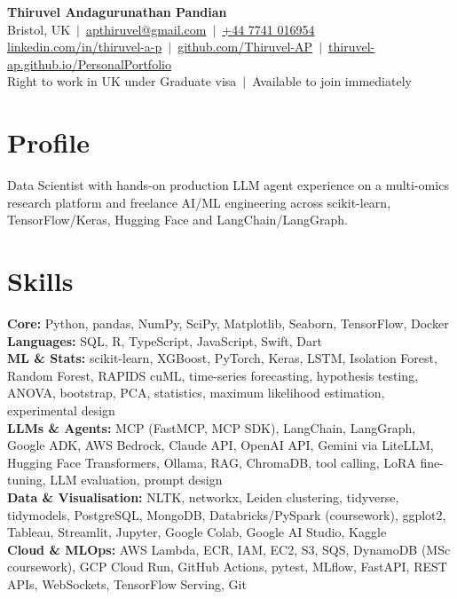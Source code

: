 \documentclass[a4paper,11pt]{article}
\begin{document}
\fontsize{11}{13.2}\selectfont

\begin{center}
  {\LARGE\bfseries Thiruvel Andagurunathan Pandian}\\[3pt]
  Bristol, UK \,$|$\, \href{mailto:apthiruvel@gmail.com}{apthiruvel@gmail.com} \,$|$\, \href{tel:+447741016954}{+44 7741 016954}\\[1pt]
\href{https://www.linkedin.com/in/thiruvel-a-p/}{linkedin.com/in/thiruvel-a-p} \,$|$\, \href{https://github.com/Thiruvel-AP}{github.com/Thiruvel-AP} \,$|$\, \href{https://thiruvel-ap.github.io/PersonalPortfolio/}{thiruvel-ap.github.io/PersonalPortfolio}\\[1pt]
  Right to work in UK under Graduate visa \,$|$\, Available to join immediately
\end{center}

\section{Profile}
Data Scientist with hands-on production LLM agent experience on a multi-omics research platform and freelance AI/ML engineering across scikit-learn, TensorFlow/Keras, Hugging Face and LangChain/LangGraph.

\section{Skills}
\textbf{Core:} Python, pandas, NumPy, SciPy, Matplotlib, Seaborn, TensorFlow, Docker\\[2pt]
\textbf{Languages:} SQL, R, TypeScript, JavaScript, Swift, Dart\\[2pt]
\textbf{ML \& Stats:} scikit-learn, XGBoost, PyTorch, Keras, LSTM, Isolation Forest, Random Forest, RAPIDS cuML, time-series forecasting, hypothesis testing, ANOVA, bootstrap, PCA, statistics, maximum likelihood estimation, experimental design\\[2pt]
\textbf{LLMs \& Agents:} MCP (FastMCP, MCP SDK), LangChain, LangGraph, Google ADK, AWS Bedrock, Claude API, OpenAI API, Gemini via LiteLLM, Hugging Face Transformers, Ollama, RAG, ChromaDB, tool calling, LoRA fine-tuning, LLM evaluation, prompt design\\[2pt]
\textbf{Data \& Visualisation:} NLTK, networkx, Leiden clustering, tidyverse, tidymodels, PostgreSQL, MongoDB, Databricks/PySpark (coursework), ggplot2, Tableau, Streamlit, Jupyter, Google Colab, Google AI Studio, Kaggle\\[2pt]
\textbf{Cloud \& MLOps:} AWS Lambda, ECR, IAM, EC2, S3, SQS, DynamoDB (MSc coursework), GCP Cloud Run, GitHub Actions, pytest, MLflow, FastAPI, REST APIs, WebSockets, TensorFlow Serving, Git
\end{document}
